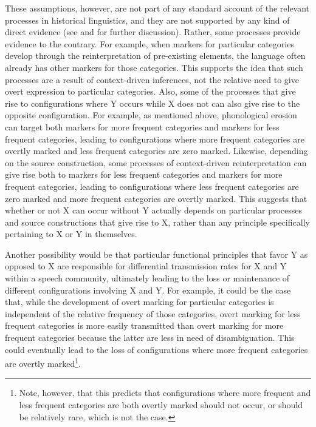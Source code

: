 \documentclass[output=paper]{langsci/langscibook}
\begin{document}
These assumptions, however, 
are not part of any standard account of the relevant processes in historical
linguistics, and they are not supported by any kind of direct evidence
 (see
\citealt{Otareferential} and \citeyear{Otacompetingmotivations} for
further discussion). Rather, some  processes provide
evidence to the contrary. 
For
example, when markers for particular categories develop through the
reinterpretation of pre-existing elements, the language often already
has other markers for those categories. This supports the idea that
such processes are a result of  context-driven inferences, 
not the relative need to give overt expression to particular categories.
Also,
some of the processes that give rise to configurations where Y
occurs while X does not can also give rise to the opposite
configuration. For example, as mentioned above, phonological erosion can target both
markers for more frequent categories and markers for less frequent
categories, leading to configurations where more frequent categories are overtly marked 
and less frequent categories are zero marked. Likewise, depending on
the source construction, some processes of context-driven reinterpretation can 
give rise both to markers for less frequent categories and markers for
more frequent categories, leading to configurations where less
frequent categories
are zero marked and more frequent categories are overtly marked.
 This suggests that whether or not X can occur without Y actually
depends on particular processes and source constructions that give
rise to X, rather than any principle specifically pertaining to X or Y in themselves.


Another possibility would be that
particular functional principles that favor Y as opposed to X are
responsible for differential transmission rates for X and Y within a
speech community, ultimately leading to the loss or maintenance  of
different configurations involving X and Y. For example, it could be
the case that, while the development of overt marking for particular
categories is independent of the relative frequency of those
categories, 
overt marking for  less frequent categories is more easily
transmitted than overt marking for more frequent categories
because the latter are less in need of disambiguation. This could eventually lead to
the loss of configurations where more frequent categories are overtly marked\footnote{Note, however, that this predicts that configurations
  where more frequent and less frequent categories are both overtly marked should not
  occur, or should be relatively rare, which is not the case.}. 
\end{document}
